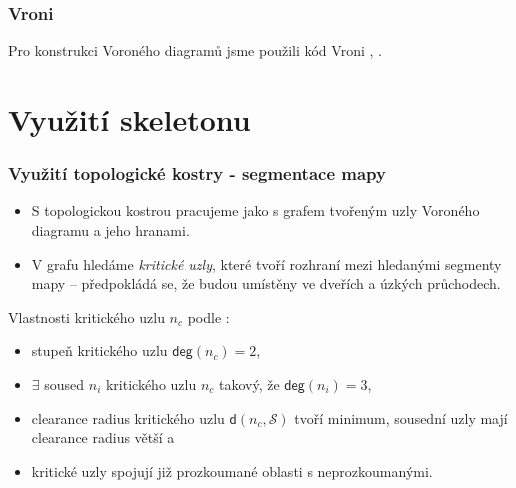 \documentclass[notes=false,pdftex]{beamer}
\begin{document}

\begin{frame}
	\frametitle{Vroni}

	Pro konstrukci Voroného diagramů jsme použili kód Vroni \cite{VroniCode}, \cite{Held200195}.

\end{frame}


\section{Využití skeletonu}
\begin{frame}
	\frametitle{Využití topologické kostry - segmentace mapy}

	\begin{itemize}
		\item S topologickou kostrou pracujeme jako s grafem tvořeným
			uzly Voroného diagramu a jeho hranami.
		\item V grafu hledáme \emph{kritické uzly}, které tvoří rozhraní
			mezi hledanými segmenty mapy -- předpokládá se, že budou umístěny
			ve dveřích a úzkých průchodech.
	\end{itemize}
	\begin{block}{Vlastnosti kritického uzlu $n_c$ podle \cite{Wurm2008Coordinated}:}
		\begin{itemize}
			\item stupeň kritického uzlu $\mathsf{deg}(n_c) = 2$,
			\item $\exists$ soused $n_i$ kritického uzlu $n_c$ takový, že $\mathsf{deg}(n_i) = 3$,
			\item clearance radius kritického uzlu $\mathsf{d}(n_c,\mathcal{S})$ tvoří minimum,
				sousední uzly mají clearance radius větší a 
			\item kritické uzly spojují již prozkoumané oblasti s neprozkoumanými.
		\end{itemize}
	\end{block}

\end{frame}

\end{document}
